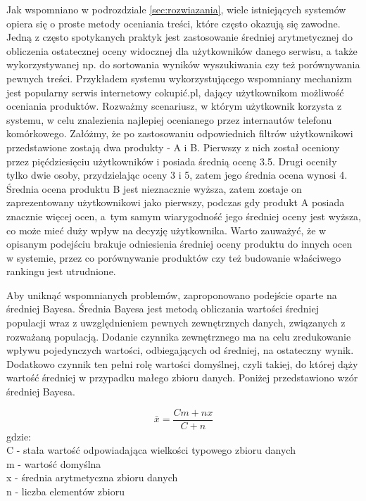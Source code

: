 Jak wspomniano w podrozdziale \ref{sec:rozwiazania}, wiele istniejących systemów opiera się o proste metody oceniania treści, które często okazują się zawodne. Jedną z często spotykanych praktyk jest zastosowanie średniej arytmetycznej do obliczenia ostatecznej oceny widocznej dla użytkowników danego serwisu, a także wykorzystywanej np. do sortowania wyników wyszukiwania czy też porównywania pewnych treści. Przykładem systemu wykorzystującego wspomniany mechanizm jest popularny serwis internetowy cokupić.pl, dający użytkownikom możliwość oceniania produktów. Rozważmy scenariusz, w którym użytkownik korzysta z systemu, w celu znalezienia najlepiej ocenianego przez internautów telefonu komórkowego. Załóżmy, że po zastosowaniu odpowiednich filtrów użytkownikowi przedstawione zostają dwa produkty - A i B. Pierwszy z nich został oceniony przez pięćdziesięciu użytkowników i posiada średnią ocenę 3.5. Drugi oceniły tylko dwie osoby, przydzielając oceny 3 i 5, zatem jego średnia ocena wynosi 4. Średnia ocena produktu B jest nieznacznie wyższa, zatem zostaje on zaprezentowany użytkownikowi jako pierwszy, podczas gdy produkt A posiada znacznie więcej ocen, a~tym samym wiarygodność jego średniej oceny jest wyższa, co może mieć duży wpływ na decyzję użytkownika. Warto zauważyć, że w opisanym podejściu brakuje odniesienia średniej oceny produktu do innych ocen w systemie, przez co porównywanie produktów czy też budowanie właściwego rankingu jest utrudnione.

Aby uniknąć wspomnianych problemów, zaproponowano podejście oparte na średniej Bayesa. Średnia Bayesa jest metodą obliczania wartości średniej populacji wraz z uwzględnieniem pewnych zewnętrznych danych, związanych z rozważaną populacją. Dodanie czynnika zewnętrznego ma na celu zredukowanie wpływu pojedynczych wartości, odbiegających od średniej, na ostateczny wynik. Dodatkowo czynnik ten pełni rolę wartości domyślnej, czyli takiej, do której dąży wartość średniej w przypadku małego zbioru danych.\cite{bayesWiki} Poniżej przedstawiono wzór średniej Bayesa.

\begin{equation}
\bar{x}=\frac{Cm+nx}{C+n}
\end{equation}
gdzie:\\
C - stała wartość odpowiadająca wielkości typowego zbioru danych\\
m - wartość domyślna\\
x - średnia arytmetyczna zbioru danych\\
n - liczba elementów zbioru\\


